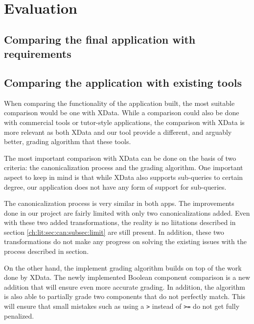 \chapter{Evaluation}

\section{Comparing the final application with requirements}

\section{Comparing the application with existing tools}

When comparing the functionality of the application built, the most suitable comparison would be one with XData. While a comparison could also be done with commercial tools or tutor-style applications, the comparison with XData is more relevant as both XData and our tool provide a different, and arguably better, grading algorithm that these tools.

The most important comparison with XData can be done on the basis of two criteria: the canonicalization process and the grading algorithm. One important aspect to keep in mind is that while XData also supports sub-queries to certain degree, our application does not have any form of support for sub-queries.

The canonicalization process is very similar in both apps. The improvements done in our project are fairly limited with only two canonicalizations added. Even with these two added transformations, the reality is no liitations described in section \ref{ch:lit:sec:can:subsec:limit} are still present. In addition, these two transformations do not make any progress on solving the existing issues with the process described in section.

On the other hand, the implement grading algorithm builds on top of the work done by XData. The newly implemented Boolean component comparison is a new addition that will ensure even more accurate grading. In addition, the algorithm is also able to partially grade two components that do not perfectly match. This will ensure that small mistakes such as using a \texttt{>} instead of \texttt{>=} do not get fully penalized.

